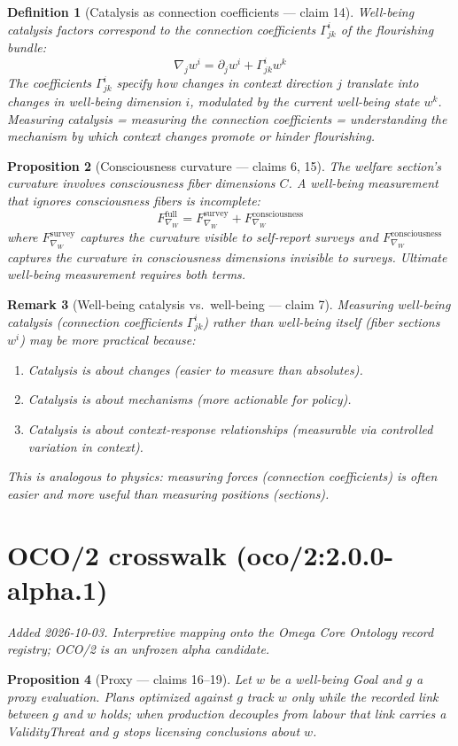 \documentclass[11pt,a4paper]{article}
\newtheorem{definition}{Definition}[section]
\newtheorem{proposition}[definition]{Proposition}
\newtheorem{remark}[definition]{Remark}
\begin{document}
\begin{definition}[Catalysis as connection coefficients --- claim 14]
\emph{Well-being catalysis factors} correspond to the connection
coefficients $\Gamma^i_{jk}$ of the flourishing bundle:
\[
  \nabla_j w^i = \partial_j w^i + \Gamma^i_{jk} w^k
\]
The coefficients $\Gamma^i_{jk}$ specify how changes in context
direction $j$ translate into changes in well-being dimension $i$,
modulated by the current well-being state $w^k$. Measuring catalysis
= measuring the connection coefficients = understanding the mechanism
by which context changes promote or hinder flourishing.
\end{definition}

\begin{proposition}[Consciousness curvature --- claims 6, 15]
\label{prop:consciousness}
The welfare section's curvature involves consciousness fiber dimensions
$C$. A well-being measurement that ignores consciousness fibers is
incomplete:
\[
  F_{\nabla_W}^{\text{full}} = F_{\nabla_W}^{\text{survey}}
    + F_{\nabla_W}^{\text{consciousness}}
\]
where $F_{\nabla_W}^{\text{survey}}$ captures the curvature visible
to self-report surveys and $F_{\nabla_W}^{\text{consciousness}}$
captures the curvature in consciousness dimensions invisible to
surveys. Ultimate well-being measurement requires both terms.
\end{proposition}

\begin{remark}[Well-being catalysis vs.\ well-being --- claim 7]
Measuring well-being catalysis (connection coefficients $\Gamma^i_{jk}$)
rather than well-being itself (fiber sections $w^i$) may be more
practical because:
\begin{enumerate}
  \item Catalysis is about \emph{changes} (easier to measure than absolutes).
  \item Catalysis is about \emph{mechanisms} (more actionable for policy).
  \item Catalysis is about \emph{context-response relationships}
    (measurable via controlled variation in context).
\end{enumerate}
This is analogous to physics: measuring forces (connection coefficients)
is often easier and more useful than measuring positions (sections).
\end{remark}



\section{OCO/2 crosswalk (oco/2:2.0.0-alpha.1)}
\emph{Added 2026-10-03. Interpretive mapping onto the Omega Core Ontology
record registry; OCO/2 is an unfrozen alpha candidate.}

\begin{proposition}[Proxy --- claims 16--19]
Let $w$ be a well-being Goal and $g$ a proxy evaluation. Plans optimized against $g$ track $w$ only while the recorded link between $g$ and $w$ holds; when production decouples from labour that link carries a ValidityThreat and $g$ stops licensing conclusions about $w$.
\end{proposition}
\end{document}
